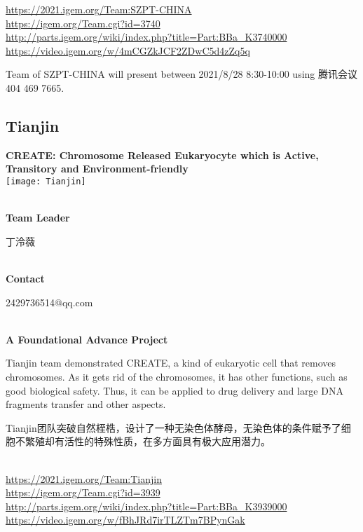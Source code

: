 \url{https://2021.igem.org/Team:SZPT-CHINA }\\
\url{https://igem.org/Team.cgi?id=3740 }\\
\url{http://parts.igem.org/wiki/index.php?title=Part:BBa_K3740000 }\\
\url{https://video.igem.org/w/4mCGZkJCF2ZDwC5d4zZq5q }\\

\vfill{}









Team of SZPT-CHINA will present between    2021/8/28 8:30-10:00     using 腾讯会议 404 469 7665.
\newpage


\subsection{\textcolor{Blu}{ Tianjin } }
\vspace{5mm}
\begin{center}
\large{
  \textbf{ CREATE: Chromosome Released Eukaryocyte which is Active, Transitory and Environment-friendly }\\

  \texttt{[image: Tianjin]}
}
\end{center}
\textbf{\\Team Leader}

  丁泠薇


\textbf{\\Contact}

  2429736514@qq.com


\textbf{\\A Foundational Advance Project\\}\begin{spacing}{1.5}

Tianjin team demonstrated CREATE, a kind of eukaryotic cell that removes chromosomes. As it gets rid of the chromosomes, it has other functions, such as good biological safety. Thus, it can be applied to drug delivery and large DNA fragments transfer and other aspects.

Tianjin团队突破自然桎梏，设计了一种无染色体酵母，无染色体的条件赋予了细胞不繁殖却有活性的特殊性质，在多方面具有极大应用潜力。\end{spacing}
\\

\url{https://2021.igem.org/Team:Tianjin }\\
\url{https://igem.org/Team.cgi?id=3939 }\\
\url{http://parts.igem.org/wiki/index.php?title=Part:BBa_K3939000 }\\
\url{https://video.igem.org/w/fBhJRd7irTLZTm7BPynGak }\\

